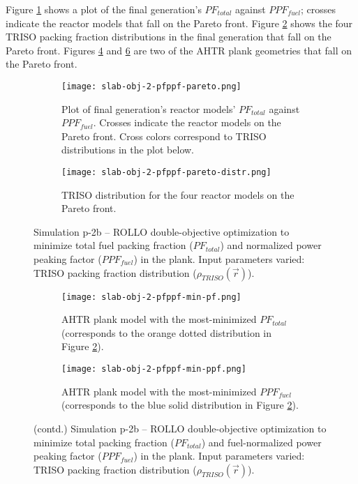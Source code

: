 Figure \ref{fig:slab-obj-2-pfppf-pareto} shows a plot of the final generation's 
$PF_{total}$ against $PPF_{fuel}$; crosses indicate the reactor models that fall on 
the Pareto front.
Figure \ref{fig:slab-obj-2-pfppf-pareto-distr} shows the four TRISO packing fraction 
distributions in the final generation that fall on the Pareto front. 
Figures \ref{fig:slab-obj-2-pfppf-min-pf} and \ref{fig:slab-obj-2-pfppf-min-ppf} 
are two of the \gls{AHTR} plank geometries that fall on the Pareto front. 
\begin{figure}[htbp!]
    \centering
    \begin{subfigure}{\textwidth}
        \texttt{[image: slab-obj-2-pfppf-pareto.png]}
        \caption{Plot of final generation's reactor models' $PF_{total}$ against 
        $PPF_{fuel}$. 
        Crosses indicate the reactor models on the Pareto front. Cross colors correspond  
        to TRISO distributions in the plot below.}
        \label{fig:slab-obj-2-pfppf-pareto} 
    \end{subfigure}
    \begin{subfigure}{\textwidth}
        \texttt{[image: slab-obj-2-pfppf-pareto-distr.png]}
        \caption{TRISO distribution for the four reactor models on the Pareto front.}
        \label{fig:slab-obj-2-pfppf-pareto-distr} 
    \end{subfigure}
    \caption{Simulation p-2b -- ROLLO double-objective optimization to minimize total fuel 
    packing fraction ($PF_{total}$) and normalized power peaking factor ($PPF_{fuel}$) 
    in the plank. 
    Input parameters varied: TRISO packing fraction distribution 
    ($\rho_{TRISO}(\vec{r})$).}
    \label{fig:slab-obj-2-pfppf}
\end{figure}
\begin{figure}[htbp!]
    \ContinuedFloat
    \begin{subfigure}{\textwidth}
        \texttt{[image: slab-obj-2-pfppf-min-pf.png]}
        \caption{\gls{AHTR} plank model with the most-minimized $PF_{total}$
        (corresponds to the orange dotted distribution in Figure 
        \ref{fig:slab-obj-2-pfppf-pareto-distr}).}
        \label{fig:slab-obj-2-pfppf-min-pf} 
    \end{subfigure}
    \begin{subfigure}{\textwidth}
        \texttt{[image: slab-obj-2-pfppf-min-ppf.png]}
        \caption{\gls{AHTR} plank model with the most-minimized $PPF_{fuel}$
        (corresponds to the blue solid distribution in Figure 
        \ref{fig:slab-obj-2-pfppf-pareto-distr}).}
        \label{fig:slab-obj-2-pfppf-min-ppf} 
    \end{subfigure}
    \caption{(contd.) Simulation p-2b -- ROLLO double-objective optimization to minimize 
    total packing fraction ($PF_{total}$) and fuel-normalized power peaking factor 
    ($PPF_{fuel}$) in the plank. 
    Input parameters varied: TRISO packing fraction distribution ($\rho_{TRISO}(\vec{r})$).}
\end{figure}

